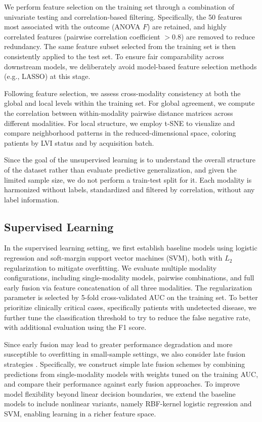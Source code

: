 \documentclass[conference]{IEEEtran}
\begin{document}
We perform feature selection on the training set through a combination of univariate testing and correlation-based filtering. Specifically, the 50 features most associated with the outcome (ANOVA $F$) are retained, and highly correlated features (pairwise correlation coefficient $> 0.8$) are removed to reduce redundancy. The same feature subset selected from the training set is then consistently applied to the test set. To ensure fair comparability across downstream models, we deliberately avoid model-based feature selection methods (e.g., LASSO) at this stage.

Following feature selection, we assess cross-modality consistency at both the global and local levels within the training set. For global agreement, we compute the correlation between within-modality pairwise distance matrices across different modalities. For local structure, we employ t-SNE to visualize and compare neighborhood patterns in the reduced-dimensional space, coloring patients by LVI status and by acquisition batch.

Since the goal of the unsupervised learning is to understand the overall structure of the dataset rather than evaluate predictive generalization, and given the limited sample size, we do not perform a train-test split for it. Each modality is harmonized without labels, standardized and filtered by correlation, without any label information.

\subsection{Supervised Learning}

In the supervised learning setting, we first establish baseline models using logistic regression and soft-margin support vector machines (SVM), both with $L_2$ regularization to mitigate overfitting. We evaluate multiple modality configurations, including single-modality models, pairwise combinations, and full early fusion via feature concatenation of all three modalities. The regularization parameter is selected by 5-fold cross-validated AUC on the training set. To better prioritize clinically critical cases, specifically patients with undetected disease, we further tune the classification threshold to try to reduce the false negative rate, with additional evaluation using the F1 score.

Since early fusion may lead to greater performance degradation and more susceptible to overfitting in small-sample settings, we also consider late fusion strategies \cite{pereira2023comparative}. Specifically, we construct simple late fusion schemes by combining predictions from single-modality models with weights tuned on the training AUC, and compare their performance against early fusion approaches. To improve model flexibility beyond linear decision boundaries, we extend the baseline models to include nonlinear variants, namely RBF-kernel logistic regression and SVM, enabling learning in a richer feature space.
\end{document}
